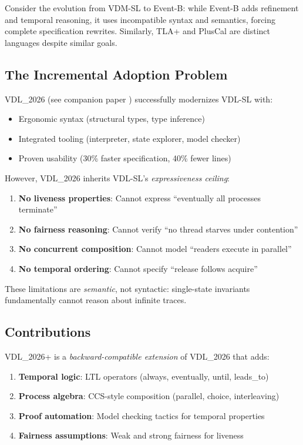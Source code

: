 \documentclass[conference]{IEEEtran}
\begin{document}
Consider the evolution from VDM-SL to Event-B: while Event-B adds refinement and temporal reasoning, it uses incompatible syntax and semantics, forcing complete specification rewrites. Similarly, TLA+ and PlusCal are distinct languages despite similar goals.

\subsection{The Incremental Adoption Problem}

VDL\_2026 (see companion paper \cite{vdl2026}) successfully modernizes VDL-SL with:
\begin{itemize}
\item Ergonomic syntax (structural types, type inference)
\item Integrated tooling (interpreter, state explorer, model checker)
\item Proven usability (30\% faster specification, 40\% fewer lines)
\end{itemize}

However, VDL\_2026 inherits VDL-SL's \textit{expressiveness ceiling}:

\begin{enumerate}
\item \textbf{No liveness properties}: Cannot express ``eventually all processes terminate''
\item \textbf{No fairness reasoning}: Cannot verify ``no thread starves under contention''
\item \textbf{No concurrent composition}: Cannot model ``readers execute in parallel''
\item \textbf{No temporal ordering}: Cannot specify ``release follows acquire''
\end{enumerate}

These limitations are \textit{semantic}, not syntactic: single-state invariants fundamentally cannot reason about infinite traces.

\subsection{Contributions}

VDL\_2026+ is a \textit{backward-compatible extension} of VDL\_2026 that adds:

\begin{enumerate}
\item \textbf{Temporal logic}: LTL operators (always, eventually, until, leads\_to)
\item \textbf{Process algebra}: CCS-style composition (parallel, choice, interleaving)
\item \textbf{Proof automation}: Model checking tactics for temporal properties
\item \textbf{Fairness assumptions}: Weak and strong fairness for liveness
\end{enumerate}
\end{document}
